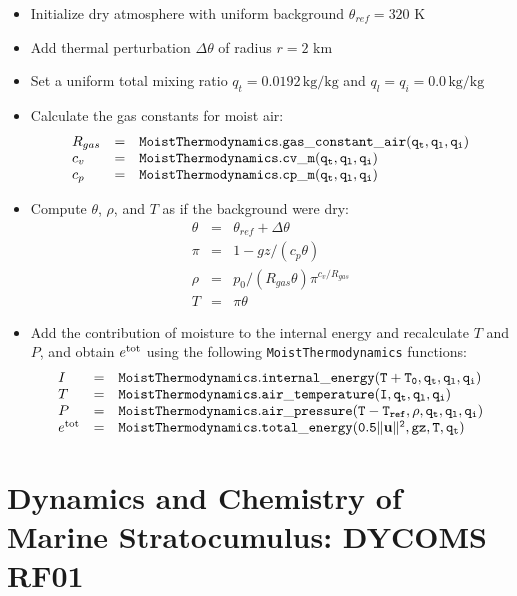 \documentclass{report}
\begin{document}
{\begin{itemize}
\item Initialize dry atmosphere with uniform background $\theta_{ref} = 320$ K
\item Add thermal perturbation $\Delta \theta$ of radius $r=2$ km
\item Set a uniform total mixing ratio $q_t = 0.0192 \,\mathrm{kg/kg}$ and $q_l = q_i = 0.0\,\mathrm{kg/kg}$
\item Calculate the gas constants for moist air: 
\[\begin{array}{lcl}
R_{gas} &=& {\tt MoistThermodynamics.gas\_constant\_air(q_t, q_l, q_i)}\\
c_v     &=& {\tt MoistThermodynamics.cv\_m(q_t, q_l, q_i)}\\
c_p     &=& {\tt MoistThermodynamics.cp\_m(q_t, q_l, q_i)}\\
\end{array}
\]
\item  Compute $\theta$, $\rho$, and $T$ as if the background were dry:\\
    \[ \begin{array}{lcl}
  \theta &=& \theta_{ref} + \Delta\theta\\
 \pi & =& 1 - gz/(c_p\theta)\\
 \rho & = & p_0/(R_{gas}\theta)\pi^{c_v/R_{gas}}\\
 T   & = &\pi \theta
\end{array}\]

\item Add the contribution of moisture to the internal energy and recalculate $T$ and $P$, and obtain $e^{\rm tot}$ using the following {\tt MoistThermodynamics} functions:
\[\begin{array}{lcl}
I &=& {\tt MoistThermodynamics.internal\_energy(T + T_0, q_t, q_l, q_i)}\\
T &=& {\tt MoistThermodynamics.air\_temperature(I, q_t, q_l, q_i)}\\
P &=& {\tt MoistThermodynamics.air\_pressure(T - T_{ref} , \rho, q_t, q_l, q_i)}\\
e^{\rm tot} &=& {\tt MoistThermodynamics.total\_energy(0.5\|{\bf u} \|^2, gz, T, q_t)}
\end{array}\]
\end{itemize}

\section{Dynamics and Chemistry of Marine Stratocumulus: DYCOMS RF01}

}
\end{document}
